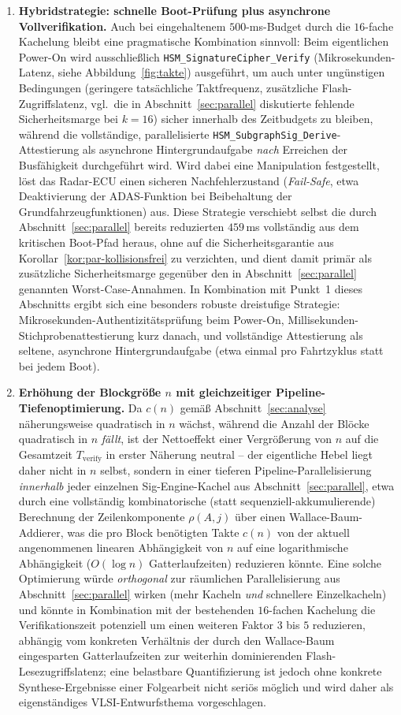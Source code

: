 ﻿\documentclass[a4paper,12pt]{article}
\theoremstyle{definition}
\begin{document}
\begin{enumerate}
	\item \textbf{Hybridstrategie: schnelle Boot-Prüfung plus asynchrone Vollverifikation.} Auch bei eingehaltenem $500$-ms-Budget durch die $16$-fache Kachelung bleibt eine pragmatische Kombination sinnvoll: Beim eigentlichen Power-On wird ausschließlich \texttt{HSM\_SignatureCipher\_Verify} (Mikrosekunden-Latenz, siehe Abbildung~\ref{fig:takte}) ausgeführt, um auch unter ungünstigen Bedingungen (geringere tatsächliche Taktfrequenz, zusätzliche Flash-Zugriffslatenz, vgl.\ die in Abschnitt~\ref{sec:parallel} diskutierte fehlende Sicherheitsmarge bei $k=16$) sicher innerhalb des Zeitbudgets zu bleiben, während die vollständige, parallelisierte \texttt{HSM\_SubgraphSig\_Derive}-Attestierung als asynchrone Hintergrundaufgabe \emph{nach} Erreichen der Busfähigkeit durchgeführt wird. Wird dabei eine Manipulation festgestellt, löst das Radar-ECU einen sicheren Nachfehlerzustand (\emph{Fail-Safe}, etwa Deaktivierung der ADAS-Funktion bei Beibehaltung der Grundfahrzeugfunktionen) aus. Diese Strategie verschiebt selbst die durch Abschnitt~\ref{sec:parallel} bereits reduzierten $459$\,ms vollständig aus dem kritischen Boot-Pfad heraus, ohne auf die Sicherheitsgarantie aus Korollar~\ref{kor:par-kollisionsfrei} zu verzichten, und dient damit primär als zusätzliche Sicherheitsmarge gegenüber den in Abschnitt~\ref{sec:parallel} genannten Worst-Case-Annahmen. In Kombination mit Punkt~1 dieses Abschnitts ergibt sich eine besonders robuste dreistufige Strategie: Mikrosekunden-Authentizitätsprüfung beim Power-On, Millisekunden-Stichprobenattestierung kurz danach, und vollständige Attestierung als seltene, asynchrone Hintergrundaufgabe (etwa einmal pro Fahrtzyklus statt bei jedem Boot).
	\item \textbf{Erhöhung der Blockgröße $n$ mit gleichzeitiger Pipeline-Tiefenoptimierung.} Da $c(n)$ gemäß Abschnitt~\ref{sec:analyse} näherungsweise quadratisch in $n$ wächst, während die Anzahl der Blöcke quadratisch in $n$ \emph{fällt}, ist der Nettoeffekt einer Vergrößerung von $n$ auf die Gesamtzeit $T_{\mathrm{verify}}$ in erster Näherung neutral -- der eigentliche Hebel liegt daher nicht in $n$ selbst, sondern in einer tieferen Pipeline-Parallelisierung \emph{innerhalb} jeder einzelnen Sig-Engine-Kachel aus Abschnitt~\ref{sec:parallel}, etwa durch eine vollständig kombinatorische (statt sequenziell-akkumulierende) Berechnung der Zeilenkomponente $\rho(A,j)$ über einen Wallace-Baum-Addierer, was die pro Block benötigten Takte $c(n)$ von der aktuell angenommenen linearen Abhängigkeit von $n$ auf eine logarithmische Abhängigkeit ($O(\log n)$ Gatterlaufzeiten) reduzieren könnte. Eine solche Optimierung würde \emph{orthogonal} zur räumlichen Parallelisierung aus Abschnitt~\ref{sec:parallel} wirken (mehr Kacheln \emph{und} schnellere Einzelkacheln) und könnte in Kombination mit der bestehenden $16$-fachen Kachelung die Verifikationszeit potenziell um einen weiteren Faktor $3$ bis $5$ reduzieren, abhängig vom konkreten Verhältnis der durch den Wallace-Baum eingesparten Gatterlaufzeiten zur weiterhin dominierenden Flash-Lesezugriffslatenz; eine belastbare Quantifizierung ist jedoch ohne konkrete Synthese-Ergebnisse einer Folgearbeit nicht seriös möglich und wird daher als eigenständiges VLSI-Entwurfsthema vorgeschlagen.

\end{enumerate}
\end{document}
